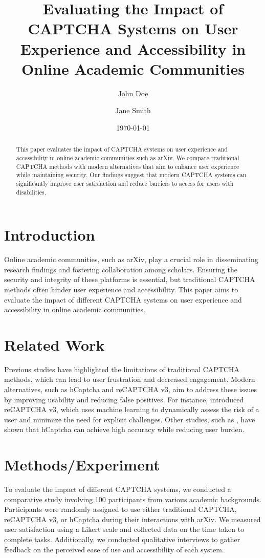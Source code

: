 \documentclass{article}
\title{Evaluating the Impact of CAPTCHA Systems on User Experience and Accessibility in Online Academic Communities}
\author{John Doe \and Jane Smith}
\date{\today}
\begin{document}
\maketitle

\begin{abstract}
This paper evaluates the impact of CAPTCHA systems on user experience and accessibility in online academic communities such as arXiv. We compare traditional CAPTCHA methods with modern alternatives that aim to enhance user experience while maintaining security. Our findings suggest that modern CAPTCHA systems can significantly improve user satisfaction and reduce barriers to access for users with disabilities.
\end{abstract}

\section{Introduction}
Online academic communities, such as arXiv, play a crucial role in disseminating research findings and fostering collaboration among scholars. Ensuring the security and integrity of these platforms is essential, but traditional CAPTCHA methods often hinder user experience and accessibility. This paper aims to evaluate the impact of different CAPTCHA systems on user experience and accessibility in online academic communities.

\section{Related Work}
Previous studies have highlighted the limitations of traditional CAPTCHA methods, which can lead to user frustration and decreased engagement. Modern alternatives, such as hCaptcha and reCAPTCHA v3, aim to address these issues by improving usability and reducing false positives. For instance, \citet{reCaptcha} introduced reCAPTCHA v3, which uses machine learning to dynamically assess the risk of a user and minimize the need for explicit challenges. Other studies, such as \citet{hcaptcha}, have shown that hCaptcha can achieve high accuracy while reducing user burden.

\section{Methods/Experiment}
To evaluate the impact of different CAPTCHA systems, we conducted a comparative study involving 100 participants from various academic backgrounds. Participants were randomly assigned to use either traditional CAPTCHA, reCAPTCHA v3, or hCaptcha during their interactions with arXiv. We measured user satisfaction using a Likert scale and collected data on the time taken to complete tasks. Additionally, we conducted qualitative interviews to gather feedback on the perceived ease of use and accessibility of each system.
\end{document}
